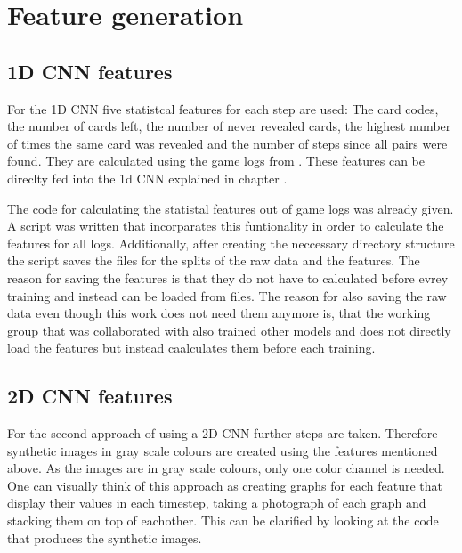 \newpage

\section{Feature generation}
\label{feature_generation}

\subsection{1D CNN features}
\label{1d_cnn_features}
For the 1D CNN five statistcal features for each step are used: The card codes, the number of cards left, the number of never revealed cards,  the highest number of times the same card was revealed and the number of steps  since all pairs were found. They are calculated using the game logs from . These features can be direclty fed into the 1d CNN explained in chapter . 

The code for calculating the statistal features out of game logs was already given. A script was written that incorparates this funtionality in order to calculate the features for all logs. Additionally, after creating the neccessary directory structure the script saves the files for the splits of the raw data and the features. The reason for saving the features is that they do not have to calculated before evrey training and instead can be loaded from files. The reason for also saving the raw data even though this work does not need them anymore is, that the working group that was collaborated with also trained other models and does not directly load the features but instead caalculates them before each training.

\subsection{2D CNN features}
\label{2d_cnn_features}

For the second approach of using a 2D CNN further steps are taken. Therefore synthetic images in gray scale colours are created using the features mentioned above. As the images are in gray scale colours, only one color channel is needed. One can visually think of this approach as creating graphs for each feature that display their values in each timestep, taking a photograph of each graph and stacking them on top of eachother. This can be clarified by looking at the code that produces the synthetic images.  

